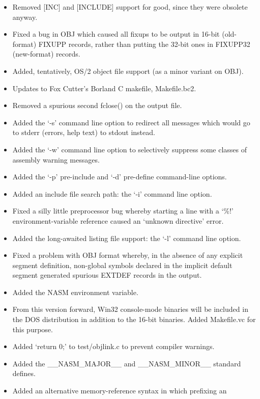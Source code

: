 \begin{itemize}
{        line.}
    \item{Removed [INC] and [INCLUDE] support for good, since they were
        obsolete anyway.}
    \item{Fixed a bug in OBJ which caused all fixups to be output in 16-bit
        (old-format) FIXUPP records, rather than putting the 32-bit ones in
        FIXUPP32 (new-format) records.}
    \item{Added, tentatively, OS/2 object file support (as a minor variant
        on OBJ).}
    \item{Updates to Fox Cutter's Borland C makefile, Makefile.bc2.}
    \item{Removed a spurious second fclose() on the output file.}
    \item{Added the `-s' command line option to redirect all messages which
        would go to stderr (errors, help text) to stdout instead.}
    \item{Added the `-w' command line option to selectively suppress some
        classes of assembly warning messages.}
    \item{Added the `-p' pre-include and `-d' pre-define command-line options.}
    \item{Added an include file search path: the `-i' command line option.}
    \item{Fixed a silly little preprocessor bug whereby starting a line with a
        `\%!' environment-variable reference caused an `unknown directive'
        error.}
    \item{Added the long-awaited listing file support: the `-l' command line
        option.}
    \item{Fixed a problem with OBJ format whereby, in the absence of any
        explicit segment definition, non-global symbols declared in the
        implicit default segment generated spurious EXTDEF records in the
        output.}
    \item{Added the NASM environment variable.}
    \item{From this version forward, Win32 console-mode binaries will be
        included in the DOS distribution in addition to the 16-bit binaries.
        Added Makefile.vc for this purpose.}
    \item{Added `return 0;' to test/objlink.c to prevent compiler warnings.}
    \item{Added the \_\_NASM\_MAJOR\_\_ and \_\_NASM\_MINOR\_\_ standard defines.}
    \item{Added an alternative memory-reference syntax in which prefixing an
}
\end{itemize}
